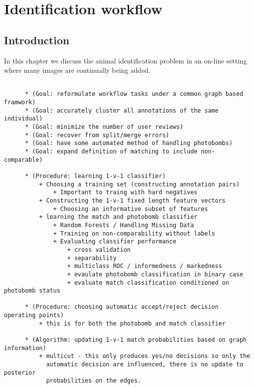 \newcommand{\nNames}[0]{N}
\newcommand{\Ltop}[0]{L_{\tt{top}}}
\newcommand{\Jname}[0]{\set{J}}
\newcommand{\nAnnots}[0]{M}

\chapter{Identification workflow}

\section{Introduction}
    In this chapter we discuss the animal identification problem in an on-line setting where many images are
      continually being added.

  \begin{verbatim}

      * (Goal: reformulate workflow tasks under a common graph based framwork)
      * (Goal: accurately cluster all annotations of the same individual)
      * (Goal: minimize the number of user reviews)
      * (Goal: recover from split/merge errors)
      * (Goal: have some automated method of handling photobombs)
      * (Goal: expand definition of matching to include non-comparable)

      * (Procedure: learning 1-v-1 classifier)
          + Choosing a training set (constructing annotation pairs)
              + Important to traing with hard negatives
          + Constructing the 1-v-1 fixed length feature vectors
              + Choosing an informative subset of features
          + learning the match and photobomb classifier
              + Random Forests / Handling Missing Data 
              + Training on non-comparability without labels
              + Evaluating classifier performance
                  + cross validation
                  + separability 
                  + multiclass ROC / informedness / markedness
                  + evaulate photobomb classification in binary case
                  + evaluate match classification conditioned on photobomb status

      * (Procedure: choosing automatic accept/reject decision operating points)
          + this is for both the photobomb and match classifier

      * (Algorithm: updating 1-v-1 match probabilities based on graph information)
          + multicut - this only produces yes/no decisions so only the
            automatic decision are influenced, there is no update to posterior
            probabilities on the edges.
            

\end{verbatim}
